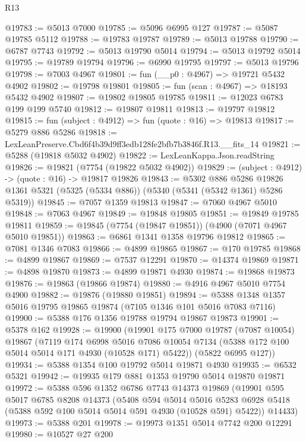 \begin{lexlean}{R13}
\begin{coremodule}
@19783 := @5013 @7000
@19785 := @5096 @6995 @127
@19787 := @5087 @19785 @5112
@19788 := @19783 @19787
@19789 := @5013 @19788
@19790 := @6787 @7743
@19792 := @5013 @19790 @5014
@19794 := @5013 @19792 @5014
@19795 := @19789 @19794
@19796 := @6990 @19795
@19797 := @5013 @19796
@19798 := @7003 @4967
@19801 := fun (__p0 : @4967) => @19721 @5432 @4902
@19802 := @19798 @19801
@19805 := fun (scan : @4967) => @18193 @5432 @4902
@19807 := @19802 @19805 @19785
@19811 := @12023 @6783 @199 @199 @5740
@19812 := @19807 @19811
@19813 := @19797 @19812
@19815 := fun (subject : @4912) => fun (quote : @16) => @19813
@19817 := @5279 @886 @5286
@19818 := LexLeanPreserve.Cbd6f4b39d9ff3edb128fe2bfb7b3846f.R13.__fits_14
@19821 := @5288 (@19818 @5032 @4902)
@19822 := LexLeanKappa.Json.readString
@19826 := @19821 (@7754 (@19822 @5032 @4902))
@19829 := (subject : @4912) -> (quote : @16) -> @19817 @19826
@19843 := @5302
    @886
    @5286
    @19826
    @1361
    @5321
    (@5325 (@5334 @886))
    (@5340 (@5341 (@5342 @1361) @5286 @5319))
@19845 := @7057 @1359 @19813
@19847 := @7060 @4967 @5010
@19848 := @7063 @4967
@19849 := @19848 @19805
@19851 := @19849 @19785 @19811
@19859 := @19845 (@7754 (@19847 @19851)) (@4900 (@7071 @4967 @5010 @19851))
@19863 := @6861 @1341 @1358 @19796 @19812
@19865 := @7081 @1346 @7083
@19866 := @4899 @19865
@19867 := @170 @19785
@19868 := @4899 @19867
@19869 := @7537 @12291
@19870 := @14374 @19869
@19871 := @4898 @19870
@19873 := @4899 @19871 @4930
@19874 := @19868 @19873
@19876 := @19863 (@19866 @19874)
@19880 := @4916 @4967 @5010 @7754 @4900
@19882 := @19876 (@19880 @19851)
@19894 := @5388 @1348 @1357 @5016 @19795 @19865 @19874 (@7105 @1346 @101 @5016 @7083 @7116)
@19900 := @5388 @176 @1356 @19788 @19794 @19867 @19873
@19901 := @5378 @162
@19928 := @19900
    (@19901
      @175
      @7000
      @19787
      (@7087 @10054)
      @19867
      (@7119
        @174
        @6998
        @5016
        @7086
        @10054
        @7134
        (@5388 @172 @100 @5014 @5014 @171 @4930 (@10528 @171) @5422))
      (@5822 @6995 @127))
@19934 := @5388 @1354 @100 @19792 @5014 @19871 @4930
@19935 := @6532 @5321
@19942 := @19935 @179 @881 @1353 @19790 @5014 @19870 @19871
@19972 := @5388
    @596
    @1352
    @6786
    @7743
    @14373
    @19869
    (@19901
      @595
      @5017
      @6785
      @8208
      @14373
      (@5408
        @594
        @5014
        @5016
        @5283
        @6928
        @5418
        (@5388 @592 @100 @5014 @5014 @591 @4930 (@10528 @591) @5422))
      @14433)
@19973 := @5388 @201
@19978 := @19973 @1351 @5014 @7742 @200 @12291
@19980 := @10527 @27 @200

\end{coremodule}
\end{lexlean}
